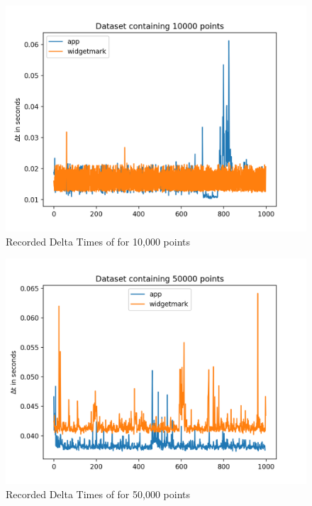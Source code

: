 \begin{figure}[h]
    \centering
    \includegraphics[width=12cm]{resources/img/evaluation/Eval_10000}
    \caption{
        Recorded Delta Times of for 10,000 points
    }
\end{figure}


\begin{figure}[h]
    \centering
    \includegraphics[width=12cm]{resources/img/evaluation/Eval_50000}
    \caption{
        Recorded Delta Times of for 50,000 points
    }
\end{figure}


